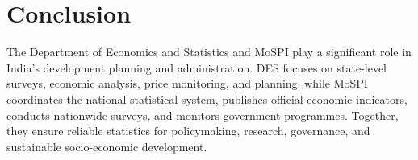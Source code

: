 \documentclass[12pt]{article}
\begin{document}
\section*{Conclusion}

The Department of Economics and Statistics and MoSPI play a significant role in India's development planning and administration. DES focuses on state-level surveys, economic analysis, price monitoring, and planning, while MoSPI coordinates the national statistical system, publishes official economic indicators, conducts nationwide surveys, and monitors government programmes. Together, they ensure reliable statistics for policymaking, research, governance, and sustainable socio-economic development.
\end{document}
